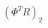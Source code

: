 \documentclass[preview]{standalone}
\begin{document}
\begin{align*}
(\Phi^{T}R)_2
\end{align*}
\end{document}

